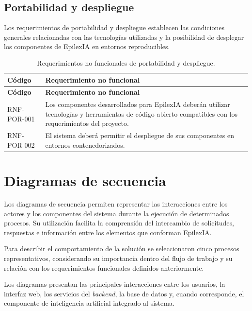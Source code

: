 \subsection{Portabilidad y despliegue}
\label{subsec:rnf-portabilidad}

Los requerimientos de portabilidad y despliegue establecen las condiciones
generales relacionadas con las tecnologías utilizadas y la posibilidad de
desplegar los componentes de EpilexIA en entornos reproducibles.

\begin{longtable}{|p{}|p{}|}
    \caption{Requerimientos no funcionales de portabilidad y despliegue.}
    \label{tab:rnf-portabilidad}\\
    \hline
    \textbf{Código} & \textbf{Requerimiento no funcional} \\
    \hline
    \endfirsthead

    \hline
    \textbf{Código} & \textbf{Requerimiento no funcional} \\
    \hline
    \endhead

    RNF-POR-001 &
    Los componentes desarrollados para EpilexIA deberán utilizar tecnologías
    y herramientas de código abierto compatibles con los requerimientos del
    proyecto. \\
    \hline

    RNF-POR-002 &
    El sistema deberá permitir el despliegue de sus componentes en entornos
    contenedorizados. \\
    \hline
\end{longtable}


\section{Diagramas de secuencia}
\label{sec:diagramas-secuencia}

Los diagramas de secuencia permiten representar las interacciones
entre los actores y los componentes del sistema durante la ejecución
de determinados procesos. Su utilización facilita la comprensión
del intercambio de solicitudes, respuestas e información entre
los elementos que conforman EpilexIA.

Para describir el comportamiento de la solución se seleccionaron cinco procesos representativos, considerando su importancia dentro del flujo de trabajo y su relación con los requerimientos funcionales definidos anteriormente.

Los diagramas presentan las principales interacciones entre
los usuarios, la interfaz web, los servicios del \textit{backend},
la base de datos y, cuando corresponde, el componente de
inteligencia artificial integrado al sistema.

